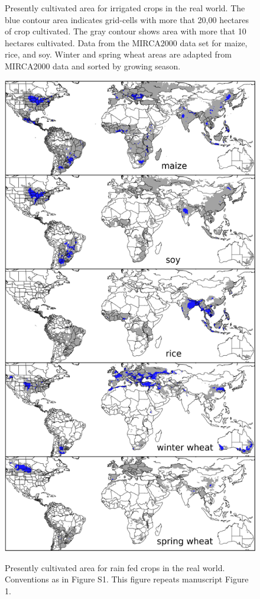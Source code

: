 \documentclass[10pt]{article}
\begin{document}
{\begin{figure}[h!]
\begin{minipage}{.45\textwidth}
    \caption{Presently cultivated area for irrigated crops in the real world. The blue contour area indicates grid-cells with more that 20,00 hectares of crop cultivated. The gray contour shows area with more that 10 hectares cultivated. Data from the MIRCA2000 data set for maize, rice, and soy. Winter and spring wheat areas are adapted from MIRCA2000 data and sorted by growing season.}
    \label{fig:irrarea}
\end{minipage}
\hspace{.05\linewidth}
\begin{minipage}{.45\textwidth}
    \centering
    \vspace{-19mm}
    \includegraphics[width=\textwidth]{s_croparea.png}\\
    \caption{Presently cultivated area for rain fed crops in the real world. Conventions as in Figure S1. This figure repeats manuscript Figure 1.}
    \label{fig:rainfed}
\end{minipage}
\end{figure}

}
\end{document}
